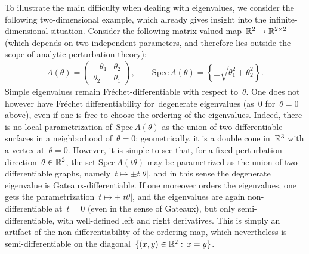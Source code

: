         To illustrate the main difficulty when dealing with eigenvalues, we consider the following two-dimensional example, which already gives insight into the infinite-dimensional situation.
        Consider the following matrix-valued map~$\mathbb{R}^2\to\mathbb{R}^{2\times 2}$ (which depends on two independent parameters, and therefore lies outside the scope of analytic perturbation theory): 
        $$A(\theta) = \begin{pmatrix}
            -\theta_1& \theta_2\\ \theta_2& \theta_1
        \end{pmatrix},\qquad \mathrm{Spec}\,A(\theta) = \left\{\pm \sqrt{\theta_1^2+\theta_2^2}\right\}.$$
        Simple eigenvalues remain Fréchet-differentiable with respect to~$\theta$.
        One does not however have Fréchet differentiability for~degenerate eigenvalues (as~$0$ for~$\theta=0$ above), even if one is free to choose the ordering of the eigenvalues. Indeed, there is no local parametrization of~$\mathrm{Spec}\,A(\theta)$ as the union of two differentiable surfaces in a neighborhood of~$\theta=0$: geometrically, it is a double cone in~$\mathbb{R}^3$ with a vertex at~$\theta=0$.  However, it is simple to see that, for a fixed perturbation direction~$\theta\in \mathbb{R}^2$, the set $\mathrm{Spec}\,A(t\theta)$ may be parametrized as the union of two differentiable graphs, namely~$t\mapsto \pm t|\theta|$, and in this sense the degenerate eigenvalue is Gateaux-differentiable.
        If one moreover orders the eigenvalues, one gets the parametrization~$t\mapsto \pm|t\theta|$, and the eigenvalues are again non-differentiable at~$t=0$ (even in the sense of Gateaux), but only semi-differentiable, with well-defined left and right derivatives. This is simply an artifact of the non-differentiability of the ordering map, which nevertheless is semi-differentiable on the diagonal~$\{(x,y)\in \mathbb{R}^2:\, x=y\}$.
        
